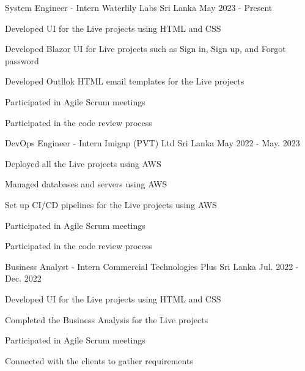 

\begin{cventries}

  \cventry
  {System Engineer - Intern} %
  {Waterlily Labs} %
  {Sri Lanka} %
  {May 2023 - Present} %
  {
    \begin{cvitems} %
      \item {Developed UI for the Live projects using HTML and CSS}
      \item {Developed Blazor UI for Live projects such as Sign in, Sign up, and Forgot password}
      \item {Developed Outllok HTML email templates for the Live projects}
      \item {Participated in Agile Scrum meetings}
      \item {Participated in the code review process}
    \end{cvitems}
  }

  \cventry
  {DevOps Engineer - Intern} %
  {Imigap (PVT) Ltd} %
  {Sri Lanka} %
  {May 2022 - May. 2023} %
  {
    \begin{cvitems} %
      \item {Deployed all the Live projects using AWS}
      \item {Managed databases and servers using AWS}
      \item {Set up CI/CD pipelines for the Live projects using AWS}
      \item {Participated in Agile Scrum meetings}
      \item {Participated in the code review process}
    \end{cvitems}
  }

  \cventry
  {Business Analyst - Intern} %
  {Commercial Technologies Plus} %
  {Sri Lanka} %
  {Jul. 2022 - Dec. 2022} %
  {
    \begin{cvitems} %
      \item {Developed UI for the Live projects using HTML and CSS}
      \item {Completed the Business Analysis for the Live projects}
      \item {Participated in Agile Scrum meetings}
      \item {Connected with the clients to gather requirements}
    \end{cvitems}
  }




\end{cventries}
